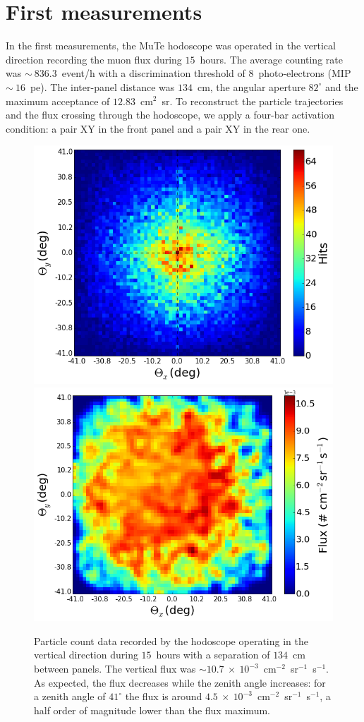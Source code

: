 \documentclass[letterpaper,11pt]{article}
\begin{document}
\section{First measurements}
\label{measurement}

In the first measurements, the MuTe hodoscope was operated in the vertical direction recording the muon flux during $15$~hours. The average counting rate was $\sim~836.3$~event/h with a discrimination threshold of $8$~photo-electrons (MIP $\sim~16$~pe). The inter-panel distance was $134$~cm, the angular aperture $82^{\circ}$ and the maximum acceptance of $12.83$~cm$^{2}$~sr. To reconstruct the particle trajectories and the flux crossing through the hodoscope, we apply a four-bar activation condition: a pair XY in the front panel and a pair XY in the rear one. 

\begin{figure}[htb]
\centering
\includegraphics[width=0.48\columnwidth]{Figures/Hits_15h.png}
\includegraphics[width=0.49\columnwidth]{Figures/Flux.png}
\caption{Particle count data recorded by the hodoscope operating in the vertical direction during $15$~hours with a separation of $134$~cm between panels. The vertical flux was $\sim 10.7~\times~10^{-3}$~cm$^{-2}$~sr$^{-1}$~s$^{-1}$. As expected, the flux decreases while the zenith angle increases: for a zenith angle of $41^{\circ}$ the flux is around $4.5~\times~10^{-3}$~cm$^{-2}$~sr$^{-1}$~s$^{-1}$, a half order of magnitude lower than the flux maximum.}
\label{fig:hits_15}
\end{figure}
\end{document}
